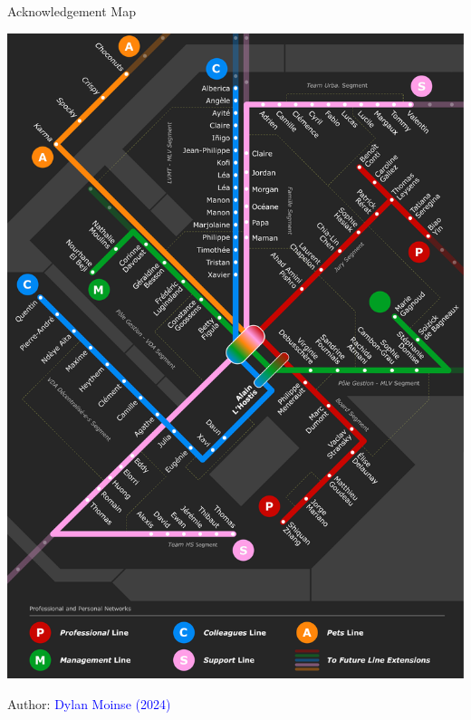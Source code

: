     \begin{carte}[h!]\vspace*{4pt}
        \caption*{Acknowledgement Map}
        \label{fig-introduction:remerciements}
        \centerline{\includegraphics[width=1\columnwidth]{src/Figures/Preambule/EN_Remerciements.pdf}}
        \vspace{5pt}
        \begin{flushright}\scriptsize{
        Author: \textcolor{blue}{Dylan Moinse (2024)}
        }\end{flushright}
    \end{carte}